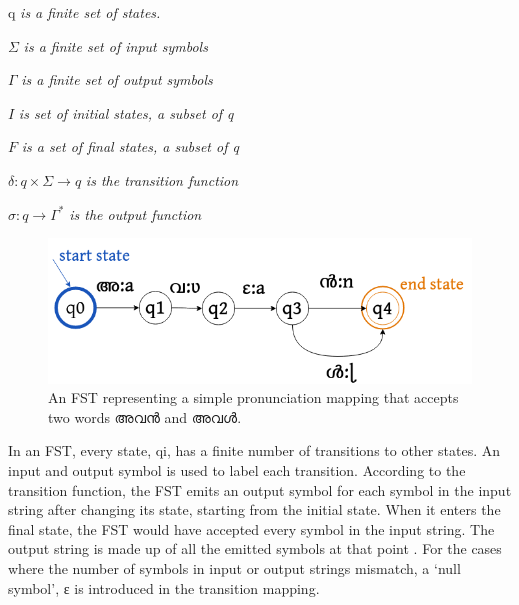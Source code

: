 {\ipa q} \textit{is a finite set of states.}

$\Sigma$  \textit{is a finite set of input symbols}

$\Gamma$ \textit{is a finite set of output symbols}

$I$ \textit{is set of initial states, a subset of q}

$F$ \textit{is a set of final states, a subset of q}

$\delta  : q \times \Sigma \xrightarrow{} q $ \textit{is the transition function}

$\sigma  : q \xrightarrow{} \Gamma^* $ \textit{is the output function}


\begin{figure}[ht]
	\centering
	\includegraphics[width=0.7\linewidth]{egfst.png}
	\caption{An FST representing a simple pronunciation mapping that accepts two words {\mal അവൻ} and {\mal  അവൾ}.}
	\label{fig:egfst}
\end{figure}


In an FST, every state, \gls{qi}, has a finite  number of transitions to other states. An input and output symbol is used to label each transition. According to the transition function, the FST emits an output symbol for each symbol in the input string after changing its state, starting from the initial state. When it enters the final state, the FST would have accepted every symbol in the input string. The output string is made up of all the emitted symbols at that point \cite{golob2012fst}. For the cases where the number of symbols in input or output strings mismatch, a `null symbol', {\ipa ɛ} is introduced in the transition mapping. 


